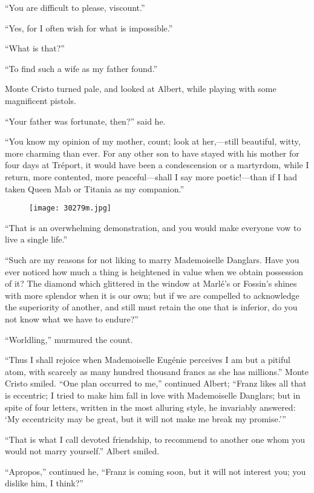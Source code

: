 “You are difficult to please, viscount.”

“Yes, for I often wish for what is impossible.”

“What is that?”

“To find such a wife as my father found.”

Monte Cristo turned pale, and looked at Albert, while playing with some
magnificent pistols.

“Your father was fortunate, then?” said he.

“You know my opinion of my mother, count; look at her,—still beautiful,
witty, more charming than ever. For any other son to have stayed with
his mother for four days at Tréport, it would have been a condescension
or a martyrdom, while I return, more contented, more peaceful—shall I
say more poetic!—than if I had taken Queen Mab or Titania as my
companion.”

\begin{figure}[ht]
\texttt{[image: 30279m.jpg]}
\end{figure}

“That is an overwhelming demonstration, and you would make everyone vow
to live a single life.”

“Such are my reasons for not liking to marry Mademoiselle Danglars.
Have you ever noticed how much a thing is heightened in value when we
obtain possession of it? The diamond which glittered in the window at
Marlé’s or Fossin’s shines with more splendor when it is our own; but
if we are compelled to acknowledge the superiority of another, and
still must retain the one that is inferior, do you not know what we
have to endure?”

“Worldling,” murmured the count.

“Thus I shall rejoice when Mademoiselle Eugénie perceives I am but a
pitiful atom, with scarcely as many hundred thousand francs as she has
millions.” Monte Cristo smiled. “One plan occurred to me,” continued
Albert; “Franz likes all that is eccentric; I tried to make him fall in
love with Mademoiselle Danglars; but in spite of four letters, written
in the most alluring style, he invariably answered: ‘My eccentricity
may be great, but it will not make me break my promise.’”

“That is what I call devoted friendship, to recommend to another one
whom you would not marry yourself.” Albert smiled.

“Apropos,” continued he, “Franz is coming soon, but it will not
interest you; you dislike him, I think?”

